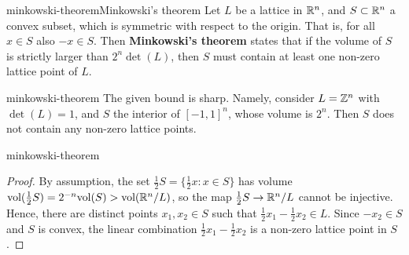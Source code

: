 \begin{topic}{minkowski-theorem}{Minkowski's theorem}
    Let $L$ be a lattice in $\mathbb{R}^n$, and $S \subset \mathbb{R}^n$ a convex subset, which is symmetric with respect to the origin. That is, for all $x \in S$ also $-x \in S$. Then \textbf{Minkowski's theorem} states that if the volume of $S$ is strictly larger than $2^n \det(L)$, then $S$ must contain at least one non-zero lattice point of $L$.
\end{topic}

\begin{example}{minkowski-theorem}
    The given bound is sharp. Namely, consider $L = \mathbb{Z}^n$ with $\det(L) = 1$, and $S$ the interior of $[-1, 1]^n$, whose volume is $2^n$. Then $S$ does not contain any non-zero lattice points.
\end{example}

\begin{example}{minkowski-theorem}
    \begin{proof}
        By assumption, the set $\tfrac{1}{2} S = \{ \tfrac{1}{2} x : x \in S \}$ has volume $\textup{vol}(\tfrac{1}{2} S) = 2^{-n} \textup{vol}(S) > \textup{vol}(\mathbb{R}^n/L)$, so the map $\tfrac{1}{2} S \to \mathbb{R}^n / L$ cannot be injective. Hence, there are distinct points $x_1, x_2 \in S$ such that $\tfrac{1}{2} x_1 - \tfrac{1}{2} x_2 \in L$. Since $-x_2 \in S$ and $S$ is convex, the linear combination $\tfrac{1}{2} x_1 - \tfrac{1}{2} x_2$ is a non-zero lattice point in $S$.
    \end{proof}
\end{example}
